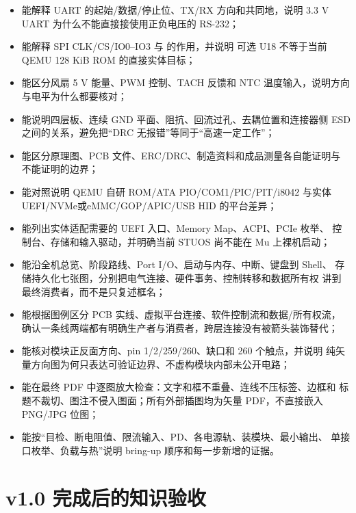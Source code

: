\begin{itemize}
        CPU 物理地址，且不能不计算就并联大量上拉；
  \item 能解释 UART 的起始/数据/停止位、TX/RX 方向和共同地，说明 3.3 V
        UART 为什么不能直接接使用正负电压的 RS-232；
  \item 能解释 SPI CLK/CS/IO0--IO3 与  的作用，并说明
        可选 U18 不等于当前 QEMU 128 KiB ROM 的直接实体目标；
  \item 能区分风扇 5 V 能量、PWM 控制、TACH 反馈和 NTC 温度输入，说明方向
        与电平为什么都要核对；
  \item 能说明四层板、连续 GND 平面、阻抗、回流过孔、去耦位置和连接器侧
        ESD 之间的关系，避免把“DRC 无报错”等同于“高速一定工作”；
  \item 能区分原理图、PCB 文件、ERC/DRC、制造资料和成品测量各自能证明与
        不能证明的边界；
  \item 能对照说明 QEMU 自研 ROM/ATA PIO/COM1/PIC/PIT/i8042 与实体
        UEFI/NVMe或eMMC/GOP/APIC/USB HID 的平台差异；
  \item 能列出实体适配需要的 UEFI 入口、Memory Map、ACPI、PCIe 枚举、
        控制台、存储和输入驱动，并明确当前 STUOS 尚不能在 Mu 上裸机启动；
  \item 能沿全机总览、阶段路线、Port I/O、启动与内存、中断、键盘到 Shell、
        存储持久化七张图，分别把电气连接、硬件事务、控制转移和数据所有权
        讲到最终消费者，而不是只复述框名；
  \item 能根据图例区分 PCB 实线、虚拟平台连接、软件控制流和数据/所有权流，
        确认一条线两端都有明确生产者与消费者，跨层连接没有被箭头装饰替代；
  \item 能核对模块正反面方向、pin 1/2/259/260、缺口和 260 个触点，并说明
        纯矢量方向图为何只表达可验证边界、不虚构模块内部未公开电路；
  \item 能在最终 PDF 中逐图放大检查：文字和框不重叠、连线不压标签、边框和
        标题不裁切、图注不侵入图面；所有外部插图均为矢量 PDF，不直接嵌入
        PNG/JPG 位图；
  \item 能按“目检、断电阻值、限流输入、PD、各电源轨、装模块、最小输出、
        单接口枚举、负载与热”说明 bring-up 顺序和每一步新增的证据。
\end{itemize}

\section*{v1.0 完成后的知识验收}

